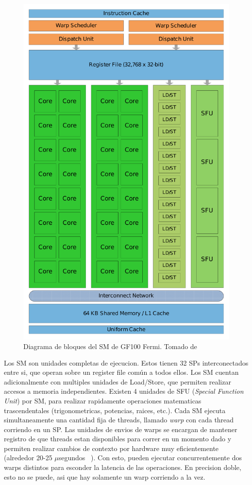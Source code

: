 \begin{figure}[htbp]
    \centering
    \includegraphics[width=\textwidth]{images/fermi-sm.pdf}
    \caption{Diagrama de bloques del SM de GF100 Fermi. Tomado de~\cite{NvidiaFermi}}
    \label{fermi_gpu_block}
\end{figure}

Los SM son unidades completas de ejecucion. Estos tienen 32 SPs interconectados entre si, que operan sobre
un register file com\'un a todos ellos. Los SM cuentan adicionalmente con multiples unidades de Load/Store,
que permiten realizar accesos a memoria independientes. Existen 4 unidades de SFU (\textit{Special Function
Unit}) por SM, para realizar rapidamente operaciones matematicas trascendentales (trigonometricas, potencias,
raices, etc.). Cada SM ejecuta simultaneamente una cantidad fija de threads, llamado \textit{warp}
con cada thread corriendo en un SP. Las unidades de envios de warps se encargan de mantener registro de que
threads estan disponibles para correr en un momento dado y permiten realizar cambios de contexto por hardware
muy eficientemente (alrededor 20-25 $\mu$segundos ~\cite{PattersonFermi}). Con esto, pueden ejecutar
concurrentemente dos warps distintos para esconder la latencia de las operaciones. En precision doble,
esto no se puede, asi que hay solamente un warp corriendo a la vez.

